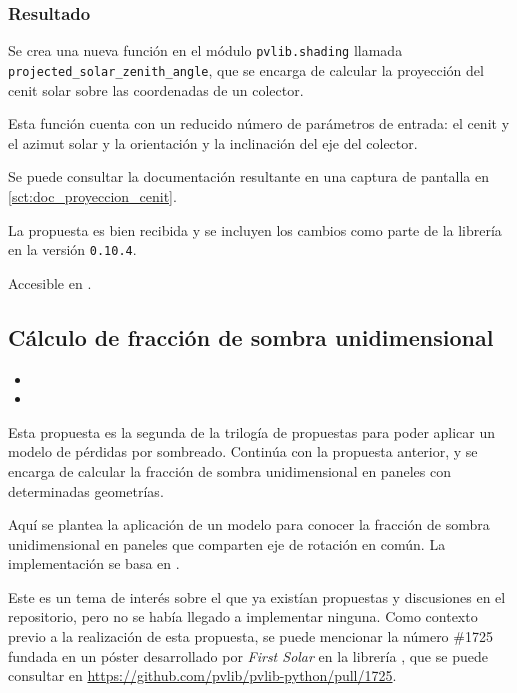 \subsubsection{Resultado}

Se crea una nueva función en el \gls{módulo} \texttt{pvlib.shading} llamada \texttt{projected\_solar\_zenith\_angle}, que se encarga de calcular la proyección del cenit solar sobre las coordenadas de un colector.

Esta función cuenta con un reducido número de parámetros de entrada: el cenit y el azimut solar y la orientación y la inclinación del eje del colector.

Se puede consultar la documentación resultante en una captura de pantalla en \ref{sct:doc_proyeccion_cenit}.

La propuesta es bien recibida y se incluyen los cambios como parte de la librería en la versión \texttt{0.10.4}.

Accesible en .

\subsection{Cálculo de fracción de \gls{sombra} unidimensional} \label{sct:desarrollo:contribuciones_cientificas:fraccion_sombra}

\begin{itemize}
    \item {}
    \item {}
\end{itemize}

Esta propuesta es la segunda de la trilogía de propuestas para poder aplicar un modelo de pérdidas por sombreado. Continúa con la propuesta anterior, y se encarga de calcular la fracción de \gls{sombra} unidimensional en paneles con determinadas geometrías.

Aquí se plantea la aplicación de un modelo para conocer la fracción de \gls{sombra} unidimensional en paneles que comparten eje de rotación en común. La implementación se basa en \cite{Anderson_Jensen_2024}.

Este es un tema de interés sobre el que ya existían propuestas y discusiones en el repositorio, pero no se había llegado a implementar ninguna. Como contexto previo a la realización de esta propuesta, se puede mencionar la número \#1725 fundada en un póster desarrollado por \textit{First Solar} en la librería \pvlibpy{}, que se puede consultar en \url{https://github.com/pvlib/pvlib-python/pull/1725}.

